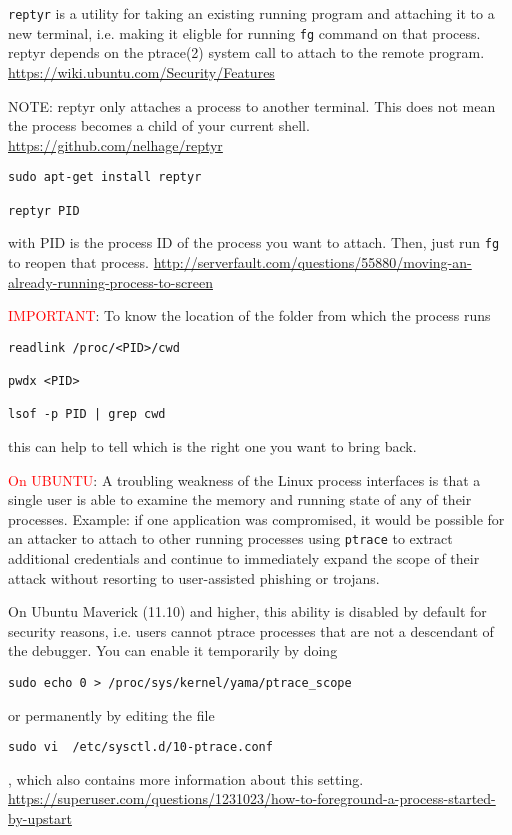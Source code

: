 \verb!reptyr! is a utility for taking an existing running program and attaching
it to a new terminal, i.e. making it eligble for running \verb!fg! command on
that process. reptyr depends on the ptrace(2) system call to attach to the
remote program. \url{https://wiki.ubuntu.com/Security/Features}

NOTE: reptyr only attaches a process to another terminal. This does not mean the
process becomes a child of your current shell.
\url{https://github.com/nelhage/reptyr}

\begin{verbatim}
sudo apt-get install reptyr

reptyr PID
\end{verbatim}
with PID is the process ID of the process you want to attach. Then, just run
\verb!fg! to reopen that process.
\url{http://serverfault.com/questions/55880/moving-an-already-running-process-to-screen}

\textcolor{red}{IMPORTANT}: To know the location of the folder from which the process runs
\begin{verbatim}
readlink /proc/<PID>/cwd

pwdx <PID>

lsof -p PID | grep cwd
\end{verbatim}
this can help to tell which is the right one you want to bring back. 

\textcolor{red}{On UBUNTU}: A troubling weakness of the Linux process interfaces
is that a single user is able to examine the memory and running state of any of
their processes.
Example: if one application was compromised, it would be possible for an
attacker to attach to other running processes using \verb!ptrace! to extract
additional credentials and continue to immediately expand the scope of their
attack without resorting to user-assisted phishing or trojans.

On Ubuntu Maverick (11.10) and higher, this ability is disabled by default for
security reasons, i.e. users cannot ptrace processes that are not a descendant
of the debugger. You can enable it temporarily by doing
\begin{verbatim}
sudo echo 0 > /proc/sys/kernel/yama/ptrace_scope
\end{verbatim}
or permanently by editing the file
\begin{verbatim}
sudo vi  /etc/sysctl.d/10-ptrace.conf
\end{verbatim}
, which also contains more information about this setting.
\url{https://superuser.com/questions/1231023/how-to-foreground-a-process-started-by-upstart}

